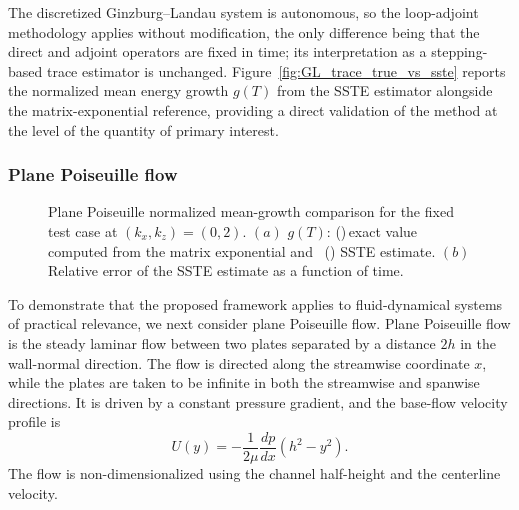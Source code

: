 \begin{appendices}
The discretized Ginzburg--Landau system is autonomous, so the loop-adjoint methodology applies without modification, the only difference being that the direct and adjoint operators are fixed in time; its interpretation as a stepping-based trace estimator is unchanged. Figure~\ref{fig:GL_trace_true_vs_sste} reports the normalized mean energy growth \(g(T)\) from the SSTE estimator alongside the matrix-exponential reference, providing a direct validation of the method at the level of the quantity of primary interest.



\subsubsection{Plane Poiseuille flow}
\label{sec:appendix_verification_poiseuille}
\begin{figure}[t]
    \centering
    \begin{minipage}[t]{0.48\textwidth}
        \centering
        \vspace{0pt}
        
    \end{minipage}
    \hfill
    \begin{minipage}[t]{0.48\textwidth}
        \centering
        \vspace{0pt}
        
    \end{minipage}
    \caption{Plane Poiseuille normalized mean-growth comparison for the fixed test case at \((k_x,k_z)=(0,2)\). \((a)\) \(g(T)\): (\solidlegend)\,exact value computed from the matrix exponential and \, (\dashlegend\circlegend) SSTE estimate. \((b)\) Relative error of the SSTE estimate as a function of time.}
    \label{fig:Poiseuille_trace_compare}
\end{figure}
To demonstrate that the proposed framework applies to fluid-dynamical systems of practical relevance, we next consider plane Poiseuille flow. Plane Poiseuille flow is the steady laminar flow between two plates separated by a distance \(2h\) in the wall-normal direction. The flow is directed along the streamwise coordinate \(x\), while the plates are taken to be infinite in both the streamwise and spanwise directions. It is driven by a constant pressure gradient, and the base-flow velocity profile is
\begin{equation}
  U(y) = -\frac{1}{2\mu}\frac{dp}{dx}\left(h^2-y^2\right).
\end{equation}
The flow is non-dimensionalized using the channel half-height and the centerline velocity.


\end{appendices}
